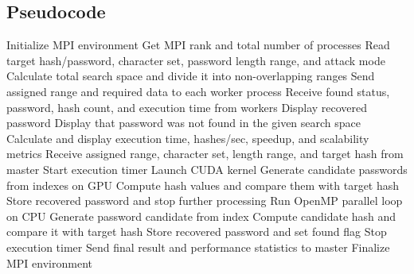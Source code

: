\documentclass[12pt,a4paper]{article}
\renewcommand{\baselinestretch}{1.5}
\begin{document}
\subsection{Pseudocode}

\begin{algorithm}[H]
\caption{Hybrid MPI--OpenMP--CUDA Password Cracking}
\footnotesize
\renewcommand{\baselinestretch}{1.0}\selectfont
\begin{algorithmic}[1]
\State Initialize MPI environment
\State Get MPI rank and total number of processes
    \State Read target hash/password, character set, password length range, and attack mode
    \State Calculate total search space and divide it into non-overlapping ranges
    \State Send assigned range and required data to each worker process
    \State Receive found status, password, hash count, and execution time from workers
        \State Display recovered password
    \Else
        \State Display that password was not found in the given search space
    \EndIf
    \State Calculate and display execution time, hashes/sec, speedup, and scalability metrics
\Else
    \State Receive assigned range, character set, length range, and target hash from master
    \State Start execution timer
            \State Launch CUDA kernel
            \State Generate candidate passwords from indexes on GPU
            \State Compute hash values and compare them with target hash
                \State Store recovered password and stop further processing
            \EndIf
        \EndFor
    \Else
        \State Run OpenMP parallel loop on CPU
            \State Generate password candidate from index
            \State Compute candidate hash and compare it with target hash
                \State Store recovered password and set found flag
            \EndIf
        \EndFor
    \EndIf
    \State Stop execution timer
    \State Send final result and performance statistics to master
\EndIf
\State Finalize MPI environment
\end{algorithmic}
\end{algorithm}
\clearpage
   \newpage
\end{document}
